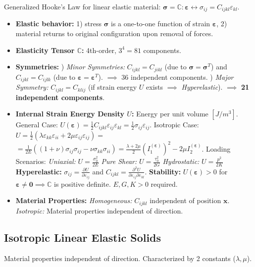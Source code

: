\documentclass[10pt,twocolumn, a4paper]{article}
\begin{document}
Generalized Hooke's Law for linear elastic material: $\bm{\sigma} = \mathbb{C} : \bm{\varepsilon} \leftrightarrow \sigma_{ij} = C_{ijkl} \varepsilon_{kl}$.
\begin{itemize}
    \item \textbf{Elastic behavior:} 1) stress $\bm{\sigma}$ is a one-to-one function of strain $\bm{\varepsilon}$, 2) material returns to original configuration upon removal of forces.
    \item \textbf{Elasticity Tensor $\mathbb{C}$:} 4th-order, $3^4 = 81$ components.
    \item \textbf{Symmetries:}
        ) \textit{Minor Symmetries:} $C_{ijkl} = C_{jikl}$ (due to $\bm{\sigma} = \bm{\sigma}^T$) and $C_{ijkl} = C_{ijlk}$ (due to $\bm{\varepsilon} = \bm{\varepsilon}^T$). $\implies$ 36 independent components.
        ) \textit{Major Symmetry:} $C_{ijkl} = C_{klij}$ (if strain energy $U$ exists $\implies$ \textit{Hyperelastic}). $\implies$ \textbf{21 independent components}.
    \item \textbf{Internal Strain Energy Density $U$:} Energy per unit volume $[J/m^{3}]$.
        \subitem General Case: $U(\bm{\varepsilon}) = \frac{1}{2} C_{ijkl} \varepsilon_{ij} \varepsilon_{kl} = \frac{1}{2} \sigma_{ij} \varepsilon_{ij}$. 
        \subitem Isotropic Case: $U = \frac{1}{2} (\lambda \varepsilon_{kk} \varepsilon_{ii} + 2\mu \varepsilon_{ij} \varepsilon_{ij}) = $
        \subitem $ = \frac{1}{2E}((1+\nu)\sigma_{ij}\sigma_{ij}-\nu\sigma_{kk}\sigma_{ii}) = \frac{\lambda+2\mu}{2} (I_1^{(\bm{\varepsilon})})^2 - 2\mu I_2^{(\bm{\varepsilon})}$.        
        \subitem Loading Scenarios:
            \subitem \textit{Uniaxial:} $U = \frac{\sigma_0^2}{2E}$
            \subitem \textit{Pure Shear:} $U = \frac{\tau_0^2}{2G}$
            \subitem \textit{Hydrostatic:} $U = \frac{p^2}{2K}$
        \subitem \textbf{Hyperelastic:} $\sigma_{ij} = \frac{\partial U}{\partial \varepsilon_{ij}}$ and $C_{ijkl} = \frac{\partial^2 U}{\partial \varepsilon_{ij} \partial \varepsilon_{kl}}$.
        \subitem \textbf{Stability:} $U(\bm{\varepsilon}) > 0$ for $\bm{\varepsilon} \neq \bm{0} \implies \mathbb{C}$ is positive definite. $E, G, K > 0$ required.
    \item \textbf{Material Properties:}
        \subitem \textit{Homogeneous:} $C_{ijkl}$ independent of position $\bm{x}$.
        \subitem \textit{Isotropic:} Material properties independent of direction.
\end{itemize}

\subsection{Isotropic Linear Elastic Solids}
Material properties independent of direction. Characterized by 2 constants ($\lambda, \mu$).
\end{document}
